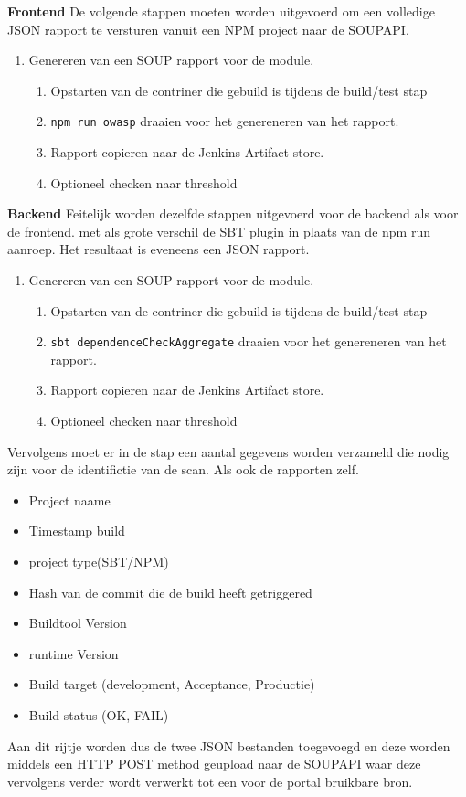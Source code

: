 \textbf{Frontend} De volgende stappen moeten worden uitgevoerd om een volledige JSON rapport te versturen vanuit een NPM project naar de SOUPAPI.
\begin{enumerate}
    \item Genereren van een SOUP rapport voor de module.
    \begin{enumerate}
        \item Opstarten van de contriner die gebuild is tijdens de build/test stap
        \item \texttt{npm run owasp} draaien voor het genereneren van het rapport.
        \item Rapport copieren naar de Jenkins Artifact store.
        \item Optioneel checken naar threshold
    \end{enumerate}
\end{enumerate}

\textbf{Backend} Feitelijk worden dezelfde stappen uitgevoerd voor de backend als voor de frontend. met als grote verschil de SBT plugin in plaats van de npm run aanroep. Het resultaat is eveneens een JSON rapport.
\begin{enumerate}
    \item Genereren van een SOUP rapport voor de module.
    \begin{enumerate}
        \item Opstarten van de contriner die gebuild is tijdens de build/test stap
        \item \texttt{sbt dependenceCheckAggregate} draaien voor het genereneren van het rapport.
        \item Rapport copieren naar de Jenkins Artifact store.
        \item Optioneel checken naar threshold
    \end{enumerate}
\end{enumerate}

Vervolgens moet er in de  stap een aantal gegevens worden verzameld die nodig zijn voor de identifictie van de scan. Als ook de rapporten zelf.
\begin{itemize}
    \item Project naame
    \item Timestamp build
    \item project type(SBT/NPM)
    \item Hash van de commit die de build heeft getriggered
    \item Buildtool Version
    \item runtime Version
    \item Build target (development, Acceptance, Productie)
    \item Build status (OK, FAIL)
\end{itemize}
Aan dit rijtje worden dus de twee JSON bestanden toegevoegd en deze worden middels een HTTP POST method geupload naar de SOUPAPI waar deze vervolgens verder wordt verwerkt tot een voor de portal bruikbare bron.


